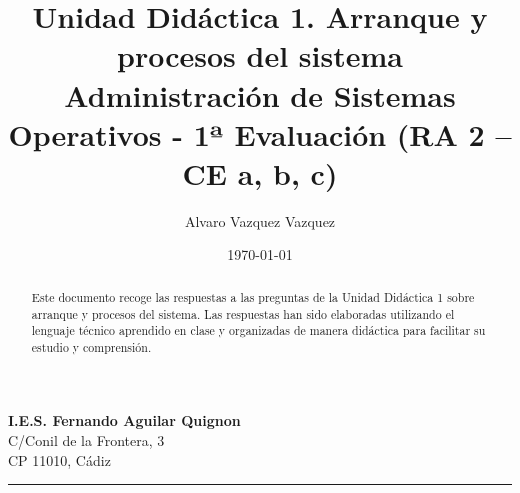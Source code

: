 \documentclass[a4paper,12pt]{article}
\title{
    \vspace{-2cm}
    \textbf{Unidad Didáctica 1. Arranque y procesos del sistema} \\
    \large Administración de Sistemas Operativos - 1ª Evaluación (RA 2 – CE a, b, c)
}
\author{Alvaro Vazquez Vazquez}
\date{\today}
\begin{document}
\maketitle

\noindent
\textbf{I.E.S. Fernando Aguilar Quignon} \\
C/Conil de la Frontera, 3 \\
CP 11010, Cádiz \\
\hrule

\vspace{0.5cm}

\begin{abstract}
Este documento recoge las respuestas a las preguntas de la Unidad Didáctica 1 sobre arranque y procesos del sistema. Las respuestas han sido elaboradas utilizando el lenguaje técnico aprendido en clase y organizadas de manera didáctica para facilitar su estudio y comprensión.
\end{abstract}

\vspace{1cm}
\end{document}
